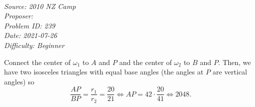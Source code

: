 \SSbreak\\
\emph{Source: 2010 NZ Camp}\\
\emph{Proposer: \Paiya}\\ %
\emph{Problem ID: 239}\\
\emph{Date: 2021-07-26}\\
\emph{Difficulty: Beginner}\\
\SSbreak

\bigskip

\begin{solution}\hfil\medskip
  
    Connect the center of $\omega_1$ to $A$ and $P$ and the center of $\omega_2$ to $B$ and $P$. 
    Then, we have two isosceles triangles with equal base angles (the angles at $P$ are vertical angles) 
    so $$\dfrac{AP}{BP} = \dfrac{r_1}{r_2} = \dfrac{20}{21} \iff AP = 42 \cdot \dfrac{20}{41} \iff \boxed{2048}.$$
\end{solution}\bigskip
